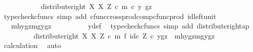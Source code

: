 \begin{isabellebody}
\ \ \ \ \ \ \isamarkupfalse%
\ \isamarkupfalse%
\ {\isachardoublequoteopen}{\isachardot}{\kern0pt}{\isachardot}{\kern0pt}{\isachardot}{\kern0pt}\ {\isacharequal}{\kern0pt}\ distribute{\isacharunderscore}{\kern0pt}right\ X\ X\ Z\ {\isasymcirc}\isactrlsub c\ {\isasymlangle}m\ {\isasymcirc}\isactrlsub c\ y{\isacharcomma}{\kern0pt}\ gz{\isasymrangle}{\isachardoublequoteclose}\isanewline
\ \ \ \ \ \ \ \ \isamarkupfalse%
\ {\isacharparenleft}{\kern0pt}typecheck{\isacharunderscore}{\kern0pt}cfuncs{\isacharcomma}{\kern0pt}\ simp\ add{\isacharcolon}{\kern0pt}\ cfunc{\isacharunderscore}{\kern0pt}cross{\isacharunderscore}{\kern0pt}prod{\isacharunderscore}{\kern0pt}comp{\isacharunderscore}{\kern0pt}cfunc{\isacharunderscore}{\kern0pt}prod\ id{\isacharunderscore}{\kern0pt}left{\isacharunderscore}{\kern0pt}unit{}{\isacharparenright}{\kern0pt}\isanewline
\ \ \ \ \ \ \isamarkupfalse%
\ \isamarkupfalse%
\ {\isachardoublequoteopen}{\isachardot}{\kern0pt}{\isachardot}{\kern0pt}{\isachardot}{\kern0pt}\ {\isacharequal}{\kern0pt}\ {\isasymlangle}{\isasymlangle}mhy{}{\isacharcomma}{\kern0pt}gz{\isasymrangle}{\isacharcomma}{\kern0pt}{\isasymlangle}mgy{}{\isacharcomma}{\kern0pt}gz{\isasymrangle}{\isasymrangle}{\isachardoublequoteclose}\isanewline
\ \ \ \ \ \ \ \ \isamarkupfalse%
\ y{\isacharunderscore}{\kern0pt}def\ \isamarkupfalse%
\ {\isacharparenleft}{\kern0pt}typecheck{\isacharunderscore}{\kern0pt}cfuncs{\isacharcomma}{\kern0pt}\ simp\ add{\isacharcolon}{\kern0pt}\ distribute{\isacharunderscore}{\kern0pt}right{\isacharunderscore}{\kern0pt}ap{\isacharparenright}{\kern0pt}\isanewline
\ \ \ \ \ \ \isamarkupfalse%
\ \isamarkupfalse%
\ {\isachardoublequoteopen}{\isacharparenleft}{\kern0pt}distribute{\isacharunderscore}{\kern0pt}right\ X\ X\ Z\ {\isasymcirc}\isactrlsub c\ m\ {\isasymtimes}\isactrlsub f\ id\isactrlsub c\ Z{\isacharparenright}{\kern0pt}\ {\isasymcirc}\isactrlsub c\ {\isasymlangle}y{\isacharcomma}{\kern0pt}gz{\isasymrangle}\ {\isacharequal}{\kern0pt}\ {\isasymlangle}{\isasymlangle}mhy{}{\isacharcomma}{\kern0pt}gz{\isasymrangle}{\isacharcomma}{\kern0pt}{\isasymlangle}mgy{}{\isacharcomma}{\kern0pt}gz{\isasymrangle}{\isasymrangle}{\isachardoublequoteclose}\isanewline
\ \ \ \ \ \ \ \ \isamarkupfalse%
\ calculation\ \isamarkupfalse%
\ auto\isanewline
\ \ \ \ \isamarkupfalse%
\isanewline
\ \ \isamarkupfalse%

\end{isabellebody}

